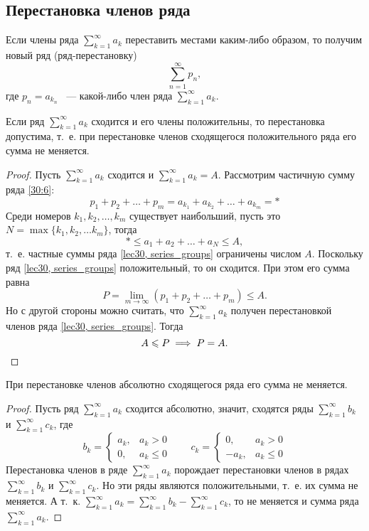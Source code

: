 \documentclass[../../main.tex]{subfiles}
\begin{document}
\subsection{Перестановка членов ряда}
Если члены ряда $\sum\limits_{k = 1}^{\infty} a_k$
переставить местами каким-либо образом, то получим новый ряд (ряд-перестановку)
\begin{equation}
\label{30:6}
\sum\limits_{n = 1}^{\infty} p_n,
\end{equation}
где $p_n = a_{k_n}$ ~--- какой-либо член ряда $\sum\limits_{k = 1}^{\infty} 
a_k$.
\begin{thm}
	Если ряд $\sum\limits_{k = 1}^{\infty} a_k$ сходится и его члены положительны,
	то перестановка допустима, т.~е. при перестановке членов сходящегося
	положительного ряда его сумма не меняется.
\end{thm}
\begin{proof}
	Пусть $\sum\limits_{k = 1}^{\infty} a_k$  сходится и
	$\sum\limits_{k = 1}^{\infty} a_k = A$. Рассмотрим
	частичную сумму ряда \eqref{30:6}:
	\[p_1 + p_2 + \ldots + p_m = a_{k_1} + a_{k_2} + \ldots + a_{k_m} = *\]
	Среди номеров $k_1, k_2, \ldots, k_m$ существует 
	наибольший, пусть это
	$N = \max\{k_1, k_2, \ldots k_m\}$, тогда \[* \leq a_1 + a_2 + \ldots +
	a_N \leq A,\] т.~е. частные суммы ряда \eqref{lec30, series_groups}
	ограничены числом $A$. Поскольку ряд \eqref{lec30, series_groups}
	положительный, то он сходится. При этом его сумма равна
	\[P = \lim\limits_{m \to \infty}(p_1 + p_2 + \ldots + p_m) \leq A.\]
	Но с другой стороны можно считать, что $\sum\limits_{k = 1}^{\infty} a_k$
	получен перестановкой членов ряда \eqref{lec30, series_groups}. Тогда
	\[A \leq P \implies P = A. \qedhere\]
\end{proof}
\begin{crl*}
	При перестановке членов абсолютно сходящегося ряда его сумма не меняется.
\end{crl*}
\begin{proof}
		Пусть ряд $\sum\limits_{k = 1}^{\infty} a_k$ сходится абсолютно,
		значит, сходятся ряды $\sum\limits_{k = 1}^{\infty} b_k$ и
		$\sum\limits_{k = 1}^{\infty} c_k$, где\[b_k = \begin{cases}
			a_k,& a_k > 0\\
			0,& a_k \le 0
		  \end{cases} \qquad
		 c_k = \begin{cases}
			0,& a_k > 0\\
			-a_k,& a_k \le 0
		  \end{cases}\]
  Перестановка членов в ряде $\sum\limits_{k = 1}^{\infty} a_k$ порождает 
  перестановки членов
  в рядах  $\sum\limits_{k = 1}^{\infty} b_k$ и
  $\sum\limits_{k = 1}^{\infty} c_k$. Но эти ряды являются положительными,
  т.~е. их сумма не меняется. А т.~к. $\sum\limits_{k = 1}^{\infty} a_k
   = \sum\limits_{k = 1}^{\infty} b_k - \sum\limits_{k = 1}^{\infty} c_k$,
   то не меняется и сумма ряда $\sum\limits_{k = 1}^{\infty} a_k$.
\end{proof}
\end{document}
